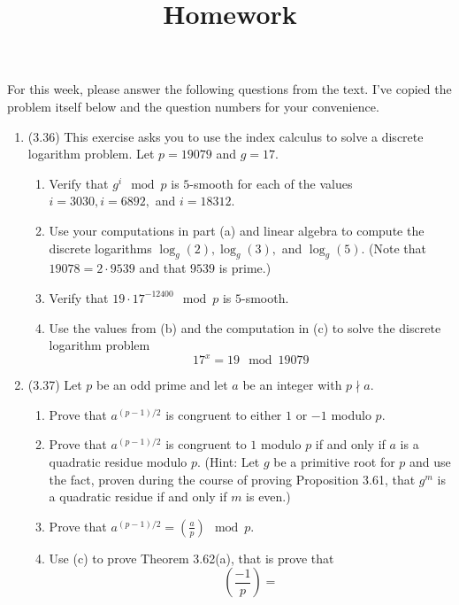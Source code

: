 \documentclass[12pt]{amsart}
\theoremstyle{definition}
\begin{document}
\title{Homework}

\maketitle

For this week, please answer the following questions from the text. 
I've copied the problem itself below and the question numbers for 
your convenience. 

\begin{enumerate}
	\item (3.36) This exercise asks you to use the index calculus 
		to solve a discrete logarithm problem. Let $p = 
		19079$ and $g=17$. 
	\begin{enumerate}
		\item Verify that $g^i \mod p$ is $5$-smooth for each 
			of the values $i = 3030, i = 6892,$ and $i = 
			18312$.
		\item Use your computations in part (a) and linear 
			algebra to compute the discrete logarithms 
			$\log_g(2), \log_g(3),$ and $\log_g(5)$. (Note 
			that $19078 = 2 \cdot 9539$ and that $9539$ 
			is prime.) 
		\item Verify that $19 \cdot 17^{-12400} \mod p$ is 
			$5$-smooth. 
		\item Use the values from (b) and the computation in 
			(c) to solve the discrete logarithm problem 
		\begin{displaymath}
			17^x = 19 \mod 19079
		\end{displaymath}
	\end{enumerate}
	\item (3.37) Let $p$ be an odd prime and let $a$ be an integer 
		with $p \nmid a$. 
	\begin{enumerate}
		\item Prove that $a^{(p-1)/2}$ is congruent to either $1$ 
			or $-1$ modulo $p$. 
		\item Prove that $a^{(p-1)/2}$ is congruent to $1$ modulo 
			$p$ if and only if $a$ is a quadratic residue 
			modulo $p$. (Hint: Let $g$ be a primitive root for 
			$p$ and use the fact, proven during the course of 
			proving Proposition 3.61, that $g^m$ is a quadratic 
			residue if and only if $m$ is even.) 
		\item Prove that $a^{(p-1)/2} = \left( \frac{a}{p} \right) 
			\mod p$. 
		\item Use (c) to prove Theorem 3.62(a), that is prove that 
		\begin{displaymath}
			\left( \frac{-1}{p} \right) = 

\end{displaymath}
\end{enumerate}
\end{enumerate}
\end{document}
